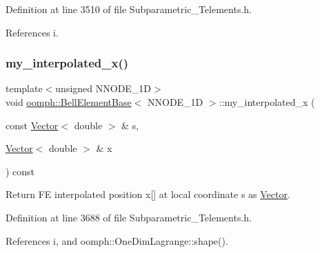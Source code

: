 Definition at line 3510 of file Subparametric\+\_\+\+Telements.\+h.



References i.

\mbox{\label{classoomph_1_1BellElementBase_a4dfe41d9fa313dcc843d17144c553190}} 
\subsubsection{\texorpdfstring{my\+\_\+interpolated\+\_\+x()}{my\_interpolated\_x()}}
{\footnotesize\ttfamily template$<$unsigned N\+N\+O\+D\+E\+\_\+1D$>$ \\
void \hyperlink{classoomph_1_1BellElementBase}{oomph\+::\+Bell\+Element\+Base}$<$ N\+N\+O\+D\+E\+\_\+1D $>$\+::my\+\_\+interpolated\+\_\+x (\begin{DoxyParamCaption}\item[{const \hyperlink{classoomph_1_1Vector}{Vector}$<$ double $>$ \&}]{s,  }\item[{\hyperlink{classoomph_1_1Vector}{Vector}$<$ double $>$ \&}]{x }\end{DoxyParamCaption}) const\hspace{0.3cm}{\ttfamily [inline]}}



Return FE interpolated position x\mbox{[}\mbox{]} at local coordinate s as \hyperlink{classoomph_1_1Vector}{Vector}. 



Definition at line 3688 of file Subparametric\+\_\+\+Telements.\+h.



References i, and oomph\+::\+One\+Dim\+Lagrange\+::shape().

\mbox{\label{classoomph_1_1BellElementBase_abd5f258248221f2f564c87ced9e0a83e}} 
